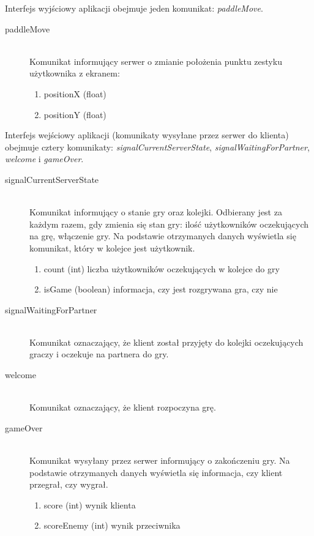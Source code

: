 Interfejs wyjściowy aplikacji obejmuje jeden komunikat: \emph{paddleMove}.

\begin{description}
	\item[paddleMove] \hfill \\
	Komunikat informujący serwer o zmianie położenia punktu zestyku użytkownika z ekranem:
	\begin{enumerate}
		\item positionX (float)
		\item positionY (float)
	\end{enumerate}
\end{description}

Interfejs wejściowy aplikacji (komunikaty wysyłane przez serwer do klienta) obejmuje cztery komunikaty: \emph{signalCurrentServerState}, \emph{signalWaitingForPartner}, \emph{welcome} i \emph{gameOver}.

\begin{description}
	\item[signalCurrentServerState] \hfill \\
	Komunikat informujący o stanie gry oraz kolejki. Odbierany jest za każdym razem, gdy zmienia się stan gry: ilość użytkowników oczekujących na grę, włączenie gry. Na podstawie otrzymanych danych wyświetla się komunikat, który w kolejce jest użytkownik.
	\begin{enumerate}
		\item count (int) liczba użytkowników oczekujących w kolejce do gry
		\item isGame (boolean) informacja, czy jest rozgrywana gra, czy nie
	\end{enumerate}
\end{description}

\begin{description}
	\item[signalWaitingForPartner] \hfill \\
	Komunikat oznaczający, że klient został przyjęty do kolejki oczekujących graczy i oczekuje na partnera do gry.
\end{description}

\begin{description}
	\item[welcome] \hfill \\
	Komunikat oznaczający, że klient rozpoczyna grę.
\end{description}

\begin{description}
	\item[gameOver] \hfill \\
	Komunikat wysyłany przez serwer informujący o zakończeniu gry. Na podstawie otrzymanych danych wyświetla się informacja, czy klient przegrał, czy wygrał.
	\begin{enumerate}
		\item score (int) wynik klienta
		\item scoreEnemy (int) wynik przeciwnika
	\end{enumerate}
\end{description}
